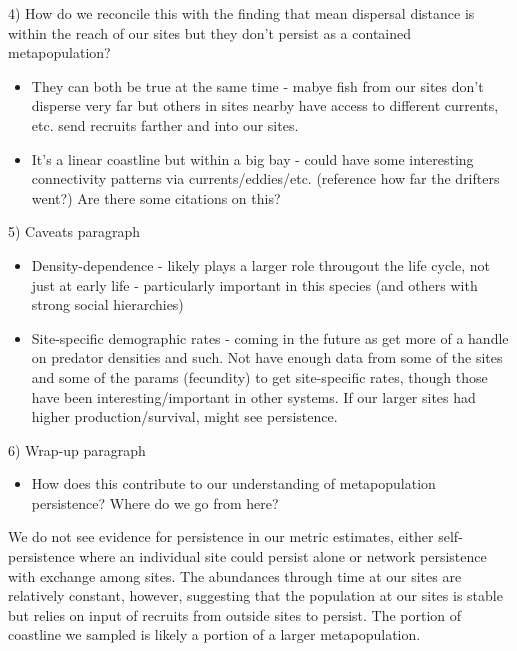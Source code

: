 \documentclass[12pt, oneside]{article}   	%
\begin{document}
4) How do we reconcile this with the finding that mean dispersal distance is within the reach of our sites but they don't persist as a contained metapopulation?
\begin{itemize}
	\item They can both be true at the same time - mabye fish from our sites don't disperse very far but others in sites nearby have access to different currents, etc. send recruits farther and into our sites. 
	\item It's a linear coastline but within a big bay - could have some interesting connectivity patterns via currents/eddies/etc. (reference how far the drifters went?) Are there some citations on this?
\end{itemize}

5) Caveats paragraph
\begin{itemize}
	\item Density-dependence - likely plays a larger role througout the life cycle, not just at early life - particularly important in this species (and others with strong social hierarchies)
	\item Site-specific demographic rates - coming in the future as get more of a handle on predator densities and such. Not have enough data from some of the sites and some of the params (fecundity) to get site-specific rates, though those have been interesting/important in other systems. If our larger sites had higher production/survival, might see persistence.
\end{itemize}

6) Wrap-up paragraph
\begin{itemize}
	\item How does this contribute to our understanding of metapopulation persistence? Where do we go from here?
\end{itemize}


We do not see evidence for persistence in our metric estimates, either self-persistence where an individual site could persist alone or network persistence with exchange among sites. The abundances through time at our sites are relatively constant, however, suggesting that the population at our sites is stable but relies on input of recruits from outside sites to persist. The portion of coastline we sampled is likely a portion of a larger metapopulation. %
\end{document}
